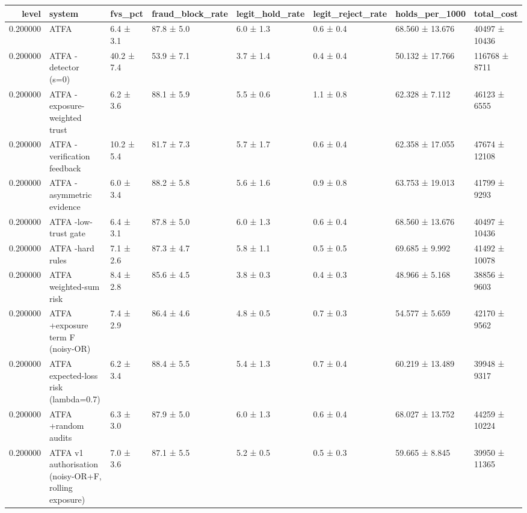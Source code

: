 \begin{tabular}{rlllllll}
\toprule
level & system & fvs\_pct & fraud\_block\_rate & legit\_hold\_rate & legit\_reject\_rate & holds\_per\_1000 & total\_cost \\
\midrule
0.200000 & ATFA & 6.4 ± 3.1 & 87.8 ± 5.0 & 6.0 ± 1.3 & 0.6 ± 0.4 & 68.560 ± 13.676 & 40497 ± 10436 \\
0.200000 & ATFA -detector (s=0) & 40.2 ± 7.4 & 53.9 ± 7.1 & 3.7 ± 1.4 & 0.4 ± 0.4 & 50.132 ± 17.766 & 116768 ± 8711 \\
0.200000 & ATFA -exposure-weighted trust & 6.2 ± 3.6 & 88.1 ± 5.9 & 5.5 ± 0.6 & 1.1 ± 0.8 & 62.328 ± 7.112 & 46123 ± 6555 \\
0.200000 & ATFA -verification feedback & 10.2 ± 5.4 & 81.7 ± 7.3 & 5.7 ± 1.7 & 0.6 ± 0.4 & 62.358 ± 17.055 & 47674 ± 12108 \\
0.200000 & ATFA -asymmetric evidence & 6.0 ± 3.4 & 88.2 ± 5.8 & 5.6 ± 1.6 & 0.9 ± 0.8 & 63.753 ± 19.013 & 41799 ± 9293 \\
0.200000 & ATFA -low-trust gate & 6.4 ± 3.1 & 87.8 ± 5.0 & 6.0 ± 1.3 & 0.6 ± 0.4 & 68.560 ± 13.676 & 40497 ± 10436 \\
0.200000 & ATFA -hard rules & 7.1 ± 2.6 & 87.3 ± 4.7 & 5.8 ± 1.1 & 0.5 ± 0.5 & 69.685 ± 9.992 & 41492 ± 10078 \\
0.200000 & ATFA weighted-sum risk & 8.4 ± 2.8 & 85.6 ± 4.5 & 3.8 ± 0.3 & 0.4 ± 0.3 & 48.966 ± 5.168 & 38856 ± 9603 \\
0.200000 & ATFA +exposure term F (noisy-OR) & 7.4 ± 2.9 & 86.4 ± 4.6 & 4.8 ± 0.5 & 0.7 ± 0.3 & 54.577 ± 5.659 & 42170 ± 9562 \\
0.200000 & ATFA expected-loss risk (lambda=0.7) & 6.2 ± 3.4 & 88.4 ± 5.5 & 5.4 ± 1.3 & 0.7 ± 0.4 & 60.219 ± 13.489 & 39948 ± 9317 \\
0.200000 & ATFA +random audits & 6.3 ± 3.0 & 87.9 ± 5.0 & 6.0 ± 1.3 & 0.6 ± 0.4 & 68.027 ± 13.752 & 44259 ± 10224 \\
0.200000 & ATFA v1 authorisation (noisy-OR+F, rolling exposure) & 7.0 ± 3.6 & 87.1 ± 5.5 & 5.2 ± 0.5 & 0.5 ± 0.3 & 59.665 ± 8.845 & 39950 ± 11365 \\
\bottomrule
\end{tabular}
